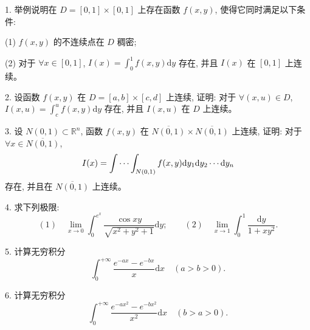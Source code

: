 \documentclass[UTF8,12pt,a4paper,fontset=fandol]{ctexart}
\begin{document}
1. 举例说明在 $D=[0,1]\times[0,1]$ 上存在函数 $f(x,y)$, 使得它同时满足以下条件:

(1) $f(x,y)$ 的不连续点在 $D$ 稠密;

(2) 对于 $\forall x\in[0,1]$, $I(x)=\int_0^1f(x,y)\mathrm dy$ 存在, 并且 $I(x)$ 在 $[0,1]$ 上连续。

2. 设函数 $f(x,y)$ 在 $D=[a,b]\times[c,d]$ 上连续, 证明: 对于 $\forall(x,u)\in D$, $I(x,u)=\int_c^u f(x,y)\mathrm dy$ 存在, 并且 $I(x,u)$ 在 $D$ 上连续。

3. 设 $N(0,1)\subset\mathbb R^n$, 函数 $f(x,y)$ 在 $\overline{N(0,1)}\times\overline{N(0,1)}$ 上连续, 证明: 对于 $\forall x\in\overline{N(0,1)}$,
\[
  I(x)=\idotsint_{N(0,1)}f(x,y)\mathrm dy_1\mathrm dy_2\cdots\mathrm dy_n
\]
存在, 并且在 $\overline{N(0,1)}$ 上连续。

4. 求下列极限:
\[
  (1)\quad \lim_{x\to0}\int_0^{e^x}\frac{\cos xy}{\sqrt{x^2+y^2+1}}\mathrm dy;
  \qquad
  (2)\quad \lim_{x\to1}\int_0^1\frac{\mathrm dy}{1+xy^2}.
\]

5. 计算无穷积分
\[
  \int_0^{+\infty}\frac{e^{-ax}-e^{-bx}}{x}\mathrm dx\quad(a>b>0).
\]

6. 计算无穷积分
\[
  \int_0^{+\infty}\frac{e^{-ax^2}-e^{-bx^2}}{x^2}\mathrm dx\quad(b>a>0).
\]
\end{document}
